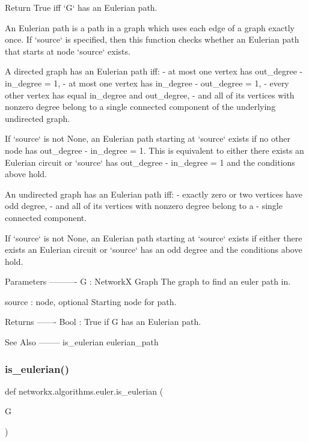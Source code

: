 \begin{DoxyVerb}Return True iff `G` has an Eulerian path.

An Eulerian path is a path in a graph which uses each edge of a graph
exactly once. If `source` is specified, then this function checks
whether an Eulerian path that starts at node `source` exists.

A directed graph has an Eulerian path iff:
    - at most one vertex has out_degree - in_degree = 1,
    - at most one vertex has in_degree - out_degree = 1,
    - every other vertex has equal in_degree and out_degree,
    - and all of its vertices with nonzero degree belong to a
      single connected component of the underlying undirected graph.

If `source` is not None, an Eulerian path starting at `source` exists if no
other node has out_degree - in_degree = 1. This is equivalent to either
there exists an Eulerian circuit or `source` has out_degree - in_degree = 1
and the conditions above hold.

An undirected graph has an Eulerian path iff:
    - exactly zero or two vertices have odd degree,
    - and all of its vertices with nonzero degree belong to a
    - single connected component.

If `source` is not None, an Eulerian path starting at `source` exists if
either there exists an Eulerian circuit or `source` has an odd degree and the
conditions above hold.

Parameters
----------
G : NetworkX Graph
    The graph to find an euler path in.

source : node, optional
    Starting node for path.

Returns
-------
Bool : True if G has an Eulerian path.

See Also
--------
is_eulerian
eulerian_path
\end{DoxyVerb}
 \mbox{\label{namespacenetworkx_1_1algorithms_1_1euler_ad3cd9baccb31ce1893b2ed9df72033be}} 
\subsubsection{\texorpdfstring{is\+\_\+eulerian()}{is\_eulerian()}}
{\footnotesize\ttfamily def networkx.\+algorithms.\+euler.\+is\+\_\+eulerian (\begin{DoxyParamCaption}\item[{}]{G }\end{DoxyParamCaption})}

